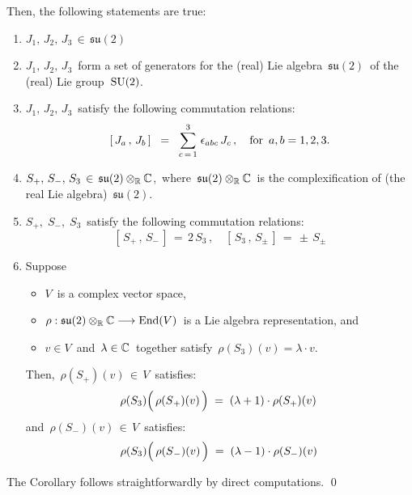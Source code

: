 \begin{proposition}
\begin{equation*}
\end{equation*}
Then, the following statements are true:
\begin{enumerate}
\item
	$J_{1},\, J_{2},\, J_{3} \,\in\, \mathfrak{su}(2)$\,
\item
	$J_{1},\, J_{2},\, J_{3}$\,
	form a set of generators for the (real) Lie algebra \,$\mathfrak{su}(2)$\, of the (real) Lie group \,$\textnormal{SU}(2)$.
\item
	$J_{1},\, J_{2},\, J_{3}$\, satisfy the following commutation relations:
	\begin{equation*}
	\left[\,J_{a}\,,\,J_{b}\,\right] \;\; = \;\; \overset{3}{\underset{c\,=\,1}{\sum}}\;\epsilon_{abc}\,J_{c}\,,
	\quad
	\textnormal{for \,$a, b = 1,2,3$}.
	\end{equation*}
\item
	$S_{+},\, S_{-},\, S_{3} \,\in\, \mathfrak{su}(2) \otimes_{\mathbb{R}} \mathbb{C}$,\,
	where
	\,$\mathfrak{su}(2) \otimes_{\mathbb{R}} \mathbb{C}$\,
	is the complexification of (the real Lie algebra)
	\,$\mathfrak{su}(2)$.
\item
	$S_{+},\; S_{-},\; S_{3}$\, satisfy the following commutation relations:
	\begin{equation*}
	\left[\,S_{+}\,,\,S_{-}\,\right] \, = \, 2\,S_{3}\,,
	\quad
	\left[\,S_{3}\,,\,S_{\pm}\,\right] \, = \, \pm\,S_{\pm}
	\end{equation*}
\item
	Suppose
	\begin{itemize}
	\item
		$V$\, is a complex vector space,
	\item
		$\rho : \mathfrak{su}(2) \otimes_{\mathbb{R}} \mathbb{C} \longrightarrow \textnormal{End}(V)$\,
		is a Lie algebra representation, and
	\item	
		$v \in V$\, and \,$\lambda \in \mathbb{C}$\, together satisfy \,$\rho(S_{3})(v) = \lambda \cdot v$.
	\end{itemize}	
	Then, \,$\rho(S_{+})(v) \,\in\, V$\, satisfies:
	\begin{equation*}
	\rho(S_{3})\!\left(\,\rho(\overset{{\color{white}.}}{S}_{+})(v)\,\right)
	\; = \;
		(\lambda+1) \cdot \rho(S_{+})(v)\,
	\end{equation*}
	and
	\,$\rho(S_{-})(v) \,\in\, V$\, satisfies:
	\begin{equation*}
	\rho(S_{3})\!\left(\,\rho(\overset{{\color{white}.}}{S}_{-})(v)\,\right)
	\; = \;
		(\lambda-1) \cdot \rho(S_{-})(v)\,
	\end{equation*}
\end{enumerate}
\end{proposition}
\proof
The Corollary follows straightforwardly by direct computations.
\qed

